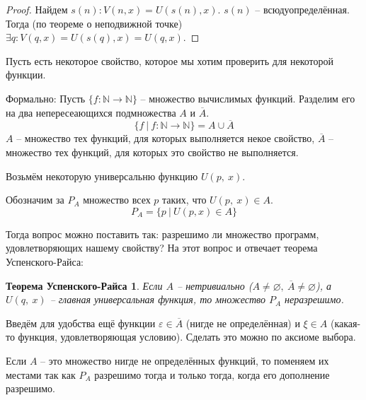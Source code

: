 \documentclass[a4paper, 12pt]{article}
\newtheorem*{usp-rais}{Теорема Успенского-Райса}
\newcommand{\N}{\mathbb{N}}
\begin{document}
\begin{proof}
    Найдем $s(n): V(n, x) = U(s(n), x)$. $s(n)$ -- всюдуопределённая.
    Тогда (по теореме о неподвижной точке)
    $\exists q : V(q, x) = U(s(q), x) = U(q, x)$.
\end{proof}

Пусть есть некоторое свойство, которое мы хотим проверить
для некоторой функции. 

Формально:
Пусть $\{f:\N\to\N\}$ -- множество вычислимых функций. 
Разделим его на два непересеающихся подмножества $A$ и $\overline{A}$.
\[
\{f\ |\ f:\N\to\N\} = A \cup \overline{A}
\]
$A$ -- множество тех функций, для которых выполняется некое свойство,
$\overline{A}$ -- множество тех функций, для которых это свойство не выполняется.

Возьмём некоторую универсальню функцию $U(p,\ x)$.

Обозначим за $P_A$ множество всех $p$ таких, что $U(p,\ x) \in A$.
\[
P_A = \{p\ |\ U(p, x) \in A\}
\]

Тогда вопрос можно поставить так: разрешимо ли множество
программ, удовлетворяющих нашему свойству? На этот вопрос и отвечает теорема
Успенского-Райса:
\begin{usp-rais}
   Если $A$ -- нетривиально ($A \neq \varnothing,\ \overline{A} \neq \varnothing$), а $U(q,\ x)$ -- главная универсальная функция, то множество $P_A$ неразрешимо.
\end{usp-rais}
Введём для удобства ещё функции $\varepsilon \in \overline{A}$ (нигде не 
определённая) и $\xi \in A$ (какая-то функция, удовлетворяющая условию).
Сделать это можно по аксиоме выбора.

Если $A$ -- это множество нигде не определённых функций, то поменяем их
местами так как $P_A$ разрешимо тогда и только тогда, когда его
дополнение разрешимо.
\end{document}
